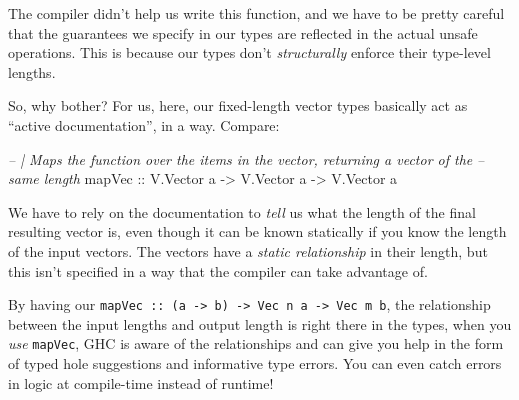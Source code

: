 \documentclass[]{article}
\newenvironment{Shaded}{}{}
\newcommand{\DataTypeTok}[1]{\textcolor[rgb]{0.56,0.13,0.00}{#1}}
\newcommand{\CommentTok}[1]{\textcolor[rgb]{0.38,0.63,0.69}{\textit{#1}}}
\newcommand{\OtherTok}[1]{\textcolor[rgb]{0.00,0.44,0.13}{#1}}
\newcommand{\NormalTok}[1]{#1}
\begin{document}
The compiler didn't help us write this function, and we have to be pretty
careful that the guarantees we specify in our types are reflected in the actual
unsafe operations. This is because our types don't \emph{structurally} enforce
their type-level lengths.

So, why bother? For us, here, our fixed-length vector types basically act as
``active documentation'', in a way. Compare:

\begin{Shaded}
\begin{Highlighting}[]
\CommentTok{-- | Maps the function over the items in the vector, returning a vector of the}
\CommentTok{-- same length}
\OtherTok{mapVec ::} \DataTypeTok{V.Vector}\NormalTok{ a }\OtherTok{->} \DataTypeTok{V.Vector}\NormalTok{ a }\OtherTok{->} \DataTypeTok{V.Vector}\NormalTok{ a}
\end{Highlighting}
\end{Shaded}

We have to rely on the documentation to \emph{tell} us what the length of the
final resulting vector is, even though it can be known statically if you know
the length of the input vectors. The vectors have a \emph{static relationship}
in their length, but this isn't specified in a way that the compiler can take
advantage of.

By having our
\texttt{mapVec\ ::\ (a\ -\textgreater{}\ b)\ -\textgreater{}\ Vec\ n\ a\ -\textgreater{}\ Vec\ m\ b},
the relationship between the input lengths and output length is right there in
the types, when you \emph{use} \texttt{mapVec}, GHC is aware of the
relationships and can give you help in the form of typed hole suggestions and
informative type errors. You can even catch errors in logic at compile-time
instead of runtime!
\end{document}
